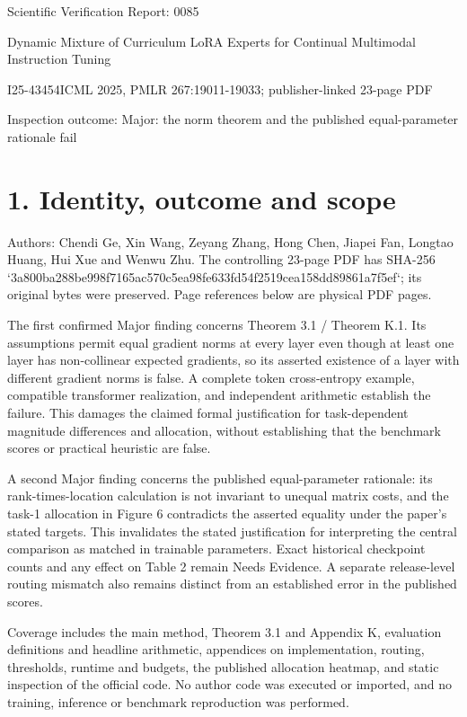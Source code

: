 \documentclass[10pt]{article}
\begin{document}
Scientific Verification Report: 0085\par
Dynamic Mixture of Curriculum LoRA Experts for Continual Multimodal Instruction Tuning\par
I25-43454ICML 2025, PMLR 267:19011-19033; publisher-linked 23-page PDF\par
Inspection outcome: Major: the norm theorem and the published equal-parameter rationale fail\par
\section*{1. Identity, outcome and scope}
Authors: Chendi Ge, Xin Wang, Zeyang Zhang, Hong Chen, Jiapei Fan, Longtao Huang, Hui Xue and Wenwu Zhu. The controlling 23-page PDF has SHA-256 `3a800ba288be998f7165ac570c5ea98fe633fd54f2519cea158dd89861a7f5ef`; its original bytes were preserved. Page references below are physical PDF pages.\par
The first confirmed Major finding concerns Theorem 3.1 / Theorem K.1. Its assumptions permit equal gradient norms at every layer even though at least one layer has non-collinear expected gradients, so its asserted existence of a layer with different gradient norms is false. A complete token cross-entropy example, compatible transformer realization, and independent arithmetic establish the failure. This damages the claimed formal justification for task-dependent magnitude differences and allocation, without establishing that the benchmark scores or practical heuristic are false.\par
A second Major finding concerns the published equal-parameter rationale: its rank-times-location calculation is not invariant to unequal matrix costs, and the task-1 allocation in Figure 6 contradicts the asserted equality under the paper’s stated targets. This invalidates the stated justification for interpreting the central comparison as matched in trainable parameters. Exact historical checkpoint counts and any effect on Table 2 remain Needs Evidence. A separate release-level routing mismatch also remains distinct from an established error in the published scores.\par
Coverage includes the main method, Theorem 3.1 and Appendix K, evaluation definitions and headline arithmetic, appendices on implementation, routing, thresholds, runtime and budgets, the published allocation heatmap, and static inspection of the official code. No author code was executed or imported, and no training, inference or benchmark reproduction was performed.\par
\end{document}
